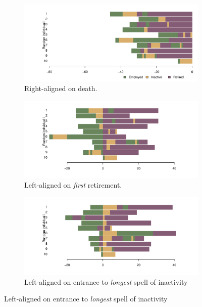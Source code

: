 \documentclass[a4paper,left=1.25cm,right=1.25cm,top=1.25cm,bottom=1.25cm]{article}
\begin{document}
 \begin{figure}[ht!]
\centering
\caption{The sequences from Figure~\ref{fig:seq10} under a variety of alignment
types.}
\label{fig:alignment}

\begin{subfigure}{\textwidth}
\centering
\caption{Right-aligned on death.}
\label{fig:seq10death}
\includegraphics[scale=.5]{Figures/Seq10deathalign.pdf}
\end{subfigure}

\begin{subfigure}{\textwidth}
\centering
\caption{Left-aligned on \emph{first} retirement.}
\label{fig:firstretire}
\includegraphics[scale=.5]{Figures/Seq10firstretirealign.pdf}
\end{subfigure}

\begin{subfigure}{\textwidth}
\centering
\caption{Left-aligned on entrance to \emph{longest} spell of inactivity}
\label{fig:longinactleft}
\includegraphics[scale=.5]{Figures/Seq10inactlongleft.pdf}
\end{subfigure}


\end{figure}
\end{document}
